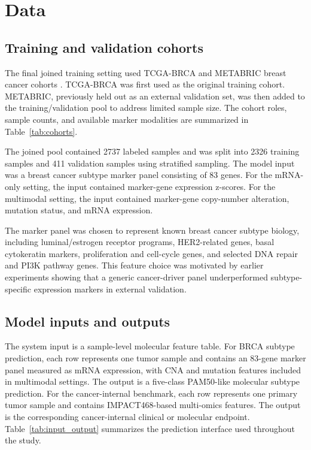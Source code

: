 \section{Data}

\subsection{Training and validation cohorts}

The final joined training setting used TCGA-BRCA and METABRIC breast cancer cohorts \cite{tcga_brca_2012,curtis_metabric_2012,pereira_metabric_2016}. TCGA-BRCA was first used as the original training cohort. METABRIC, previously held out as an external validation set, was then added to the training/validation pool to address limited sample size. The cohort roles, sample counts, and available marker modalities are summarized in Table~\ref{tab:cohorts}.

The joined pool contained 2737 labeled samples and was split into 2326 training samples and 411 validation samples using stratified sampling. The model input was a breast cancer subtype marker panel consisting of 83 genes. For the mRNA-only setting, the input contained marker-gene expression z-scores. For the multimodal setting, the input contained marker-gene copy-number alteration, mutation status, and mRNA expression.

The marker panel was chosen to represent known breast cancer subtype biology, including luminal/estrogen receptor programs, HER2-related genes, basal cytokeratin markers, proliferation and cell-cycle genes, and selected DNA repair and PI3K pathway genes. This feature choice was motivated by earlier experiments showing that a generic cancer-driver panel underperformed subtype-specific expression markers in external validation.

\subsection{Model inputs and outputs}

The system input is a sample-level molecular feature table. For BRCA subtype prediction, each row represents one tumor sample and contains an 83-gene marker panel measured as mRNA expression, with CNA and mutation features included in multimodal settings. The output is a five-class PAM50-like molecular subtype prediction. For the cancer-internal benchmark, each row represents one primary tumor sample and contains IMPACT468-based multi-omics features. The output is the corresponding cancer-internal clinical or molecular endpoint. Table~\ref{tab:input_output} summarizes the prediction interface used throughout the study.

